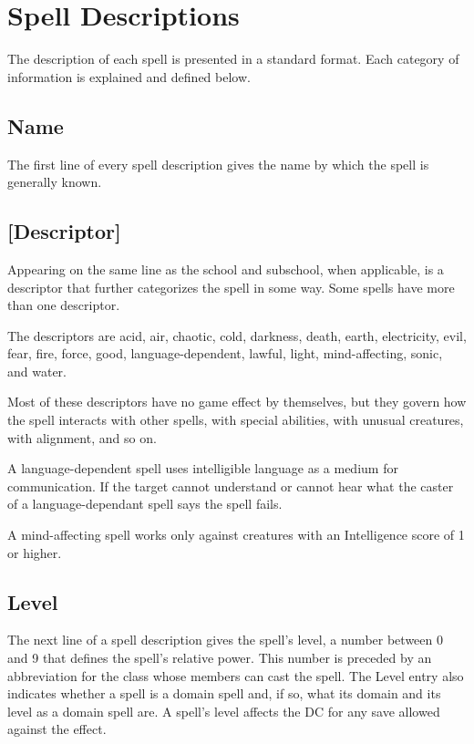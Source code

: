 \section{Spell Descriptions}
The description of each spell is presented in a standard format. Each category of information is explained and defined below.

\subsection{Name}
The first line of every spell description gives the name by which the spell is generally known.



\subsection{[Descriptor]}
Appearing on the same line as the school and subschool, when applicable, is a descriptor that further categorizes the spell in some way. Some spells have more than one descriptor.

The descriptors are acid, air, chaotic, cold, darkness, death, earth, electricity, evil, fear, fire, force, good, language-dependent, lawful, light, mind-affecting, sonic, and water.

Most of these descriptors have no game effect by themselves, but they govern how the spell interacts with other spells, with special abilities, with unusual creatures, with alignment, and so on.

A language-dependent spell uses intelligible language as a medium for communication. If the target cannot understand or cannot hear what the caster of a language-dependant spell says the spell fails.

A mind-affecting spell works only against creatures with an Intelligence score of 1 or higher.

\subsection{Level}
The next line of a spell description gives the spell's level, a number between 0 and 9 that defines the spell's relative power. This number is preceded by an abbreviation for the class whose members can cast the spell. The Level entry also indicates whether a spell is a domain spell and, if so, what its domain and its level as a domain spell are. A spell's level affects the DC for any save allowed against the effect.

